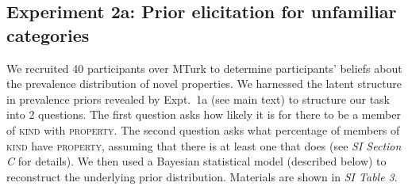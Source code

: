 \documentclass[10pt,letterpaper]{article}
\begin{document}
\subsection{Experiment 2a: Prior elicitation for unfamiliar categories}
We recruited 40 participants over MTurk to determine participants' beliefs about the prevalence distribution of novel properties.
We harnessed the latent structure in prevalence priors revealed by Expt.~1a (see main text) to structure our task into 2 questions.
The first question asks how likely it is for there to be a member of \textsc{kind} with \textsc{property}.
The second question asks what percentage of members of \textsc{kind} have \textsc{property}, assuming that there is at least one that does (see {\it SI Section C} for details).
We then used a Bayesian statistical model (described below) to reconstruct the underlying prior distribution. 
Materials are shown in {\it SI Table 3}.
\end{document}
